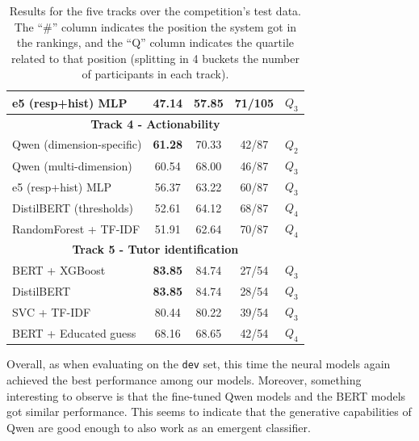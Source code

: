 \documentclass[11pt]{article}
\begin{document}
\begin{table}[ht!]
{\begin{tabular}{lcccc}
e5 (resp+hist) MLP & 47.14 & 57.85 & 71/105  & $Q_3$ \\
\hline
\multicolumn{5}{c}{\textbf{Track 4 - Actionability}} \\
\hline
Qwen (dimension-specific) & \textbf{61.28} & 70.33 & 42/87 & $Q_2$   \\
Qwen (multi-dimension) & 60.54 & 68.00 & 46/87  & $Q_3$ \\
e5 (resp+hist) MLP & 56.37 & 63.22 & 60/87  &  $Q_3$ \\
DistilBERT (thresholds) & 52.61 & 64.12  & 68/87 & $Q_4$ \\
RandomForest + TF-IDF & 51.91 & 62.64 & 70/87 & $Q_4$ \\
\hline
\multicolumn{5}{c}{\textbf{Track 5 - Tutor identification}} \\
\hline
BERT + XGBoost & \textbf{83.85} & 84.74 & 27/54 & $Q_3$  \\
DistilBERT & \textbf{83.85} & 84.74 & 28/54 & $Q_3$   \\
SVC + TF-IDF & 80.44 & 80.22 & 39/54 & $Q_3$  \\
BERT + Educated guess & 68.16 & 68.65 & 42/54 &  $Q_4$ \\
\hline
\end{tabular}
}
\caption{Results for the five tracks over the competition's test data. The ``\#'' column indicates the position the system got in the rankings, and the ``Q'' column indicates the quartile related to that position (splitting in 4 buckets the number of participants in each track).}
\label{tab:submissions}
\end{table}





Overall, as when evaluating on the \texttt{dev} set, this time the neural models again achieved the best performance among our models.
Moreover, something interesting to observe is that the fine-tuned Qwen models and the BERT models got similar performance. 
This seems to indicate that the generative capabilities of Qwen are good enough to also work as an emergent classifier.

\end{document}
